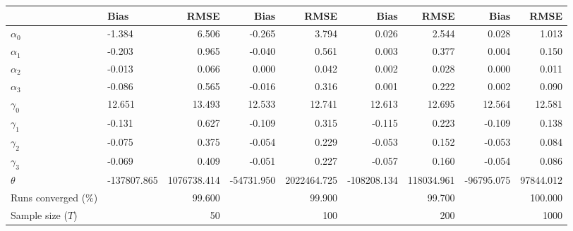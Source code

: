 
\begin{tabular}[t]{llrrrrrrr}
\toprule
  & Bias & RMSE & Bias & RMSE & Bias & RMSE & Bias & RMSE\\
\midrule
$\alpha_{0}$ & -1.384 & 6.506 & -0.265 & 3.794 & 0.026 & 2.544 & 0.028 & 1.013\\
$\alpha_{1}$ & -0.203 & 0.965 & -0.040 & 0.561 & 0.003 & 0.377 & 0.004 & 0.150\\
$\alpha_{2}$ & -0.013 & 0.066 & 0.000 & 0.042 & 0.002 & 0.028 & 0.000 & 0.011\\
$\alpha_{3}$ & -0.086 & 0.565 & -0.016 & 0.316 & 0.001 & 0.222 & 0.002 & 0.090\\
$\gamma_{0}$ & 12.651 & 13.493 & 12.533 & 12.741 & 12.613 & 12.695 & 12.564 & 12.581\\
$\gamma_{1}$ & -0.131 & 0.627 & -0.109 & 0.315 & -0.115 & 0.223 & -0.109 & 0.138\\
$\gamma_{2}$ & -0.075 & 0.375 & -0.054 & 0.229 & -0.053 & 0.152 & -0.053 & 0.084\\
$\gamma_{3}$ & -0.069 & 0.409 & -0.051 & 0.227 & -0.057 & 0.160 & -0.054 & 0.086\\
$\theta$ & -137807.865 & 1076738.414 & -54731.950 & 2022464.725 & -108208.134 & 118034.961 & -96795.075 & 97844.012\\
Runs converged (\%) &  & 99.600 &  & 99.900 &  & 99.700 &  & 100.000\\
Sample size ($T$) &  & 50 &  & 100 &  & 200 &  & 1000\\
\bottomrule
\end{tabular}
